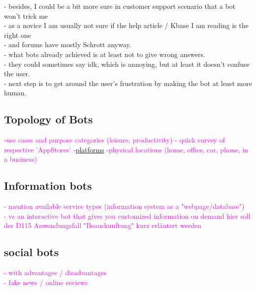 {- besides, I could be a bit more sure in customer support scenario that a bot won't trick me\\
- as a novice I am usually not sure if the help article / Kbase I am reading is the right one\\
- and forums have mostly Schrott anyway.\\
- what bots already achieved is at least not to give wrong answers.\\
- they could sometimes say idk, which is annoying, but at least it doesn't confuse the user.\\
- next step is to get around the user's frustration by making the bot at least more human.
}


\subsection{Topology of Bots}
\textcolor{magenta}{
-use cases and purpose categories (leisure, productivity) - quick survey of respective 'AppStores'
-\href{https://www.npr.org/podcasts/510308/hidden-brain}{platforms}
-physical locations (home, office, car, phone, in a business)
}

\subsection{Information bots}
\textcolor{magenta}{
	- mention available service types (information system as a "webpage/database")\\
	- vs an interactive bot that gives you customized information on demand
	hier soll der D115 Anwendungsfall "Beauskunftung" kurz erl\"autert werden\\
}
\subsection{social bots}
\textcolor{magenta}{
	- with advantages / disadvantages\\
	- fake news / online reviews\\
}

